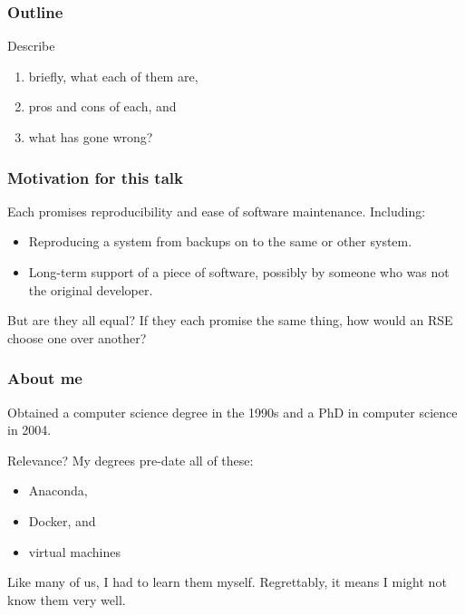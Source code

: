 \documentclass[11pt,aspectratio=43,ignorenonframetext,t]{beamer}
\begin{document}
\begin{frame}

\frametitle{Outline}

Describe
\begin{enumerate}
  \item briefly, what each of them are,
  \item pros and cons of each, and
  \item what has gone wrong?
\end{enumerate}

\end{frame}


\begin{frame}

\frametitle{Motivation for this talk}

Each promises reproducibility and ease of software maintenance.  Including:
\vs

\begin{itemize}
  \item Reproducing a system from backups on to the same or other system.
  \item Long-term support of a piece of software, possibly by someone who was not the original developer.
\end{itemize}
\vs

But are they all equal?  If they each promise the same thing, how would an RSE choose one over another? \pause

\end{frame}


\begin{frame}

\frametitle{About me}

Obtained a computer science degree in the 1990s and a PhD in computer science in 2004.
\vs

Relevance?  My degrees pre-date all of these:
\begin{itemize}
  \item Anaconda, 
  \item Docker, and
  \item virtual machines
\end{itemize}
\vs

Like many of us, I had to learn them myself.  Regrettably, it means I might not know them very well.

\end{frame}
\end{document}
